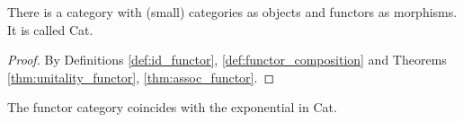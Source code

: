\begin{theorem}
  There is a category with (small) categories as objects and functors as
  morphisms. It is called Cat.

  \begin{proof}
    By Definitions \ref{def:id_functor}, \ref{def:functor_composition} and Theorems \ref{thm:unitality_functor}, \ref{thm:assoc_functor}.
  \end{proof}
\end{theorem}

\begin{remark}
  The functor category coincides with the exponential in Cat.
\end{remark}